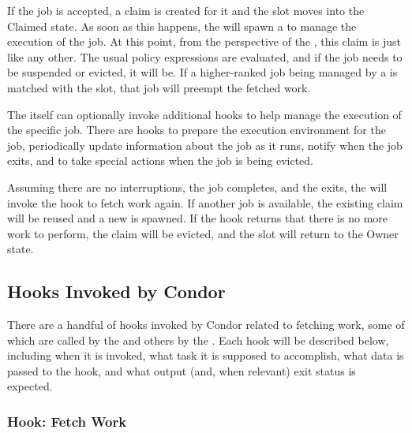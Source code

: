 If the job is accepted, a claim is created for it and the slot moves
into the Claimed state.
As soon as this happens, the  will spawn a
 to manage the execution of the job.
At this point, from the perspective of the , this claim
is just like any other.
The usual policy expressions are evaluated, and if the job needs to be
suspended or evicted, it will be.
If a higher-ranked job being managed by a  is matched
with the slot, that job will preempt the fetched work.

The  itself can optionally invoke additional hooks to
help manage the execution of the specific job.
There are hooks to prepare the execution environment for the job,
periodically update information about the job as it runs, notify when
the job exits, and to take special actions when the job is being evicted.

Assuming there are no interruptions, the job completes, and the
 exits, the  will invoke the hook to
fetch work again.
If another job is available, the existing claim will be reused and a
new  is spawned.
If the hook returns that there is no more work to perform, the claim
will be evicted, and the slot will return to the Owner state.


\subsection{\label{sec:job-hooks-hooks}
Hooks Invoked by Condor}

There are a handful of hooks invoked by Condor related to fetching
work, some of which are called by the  and others by
the .
Each hook will be described below, including when it is invoked, what
task it is supposed to accomplish, what data is passed to the hook,
and what output (and, when relevant) exit status is expected.


\subsubsection{\label{sec:job-hooks-fetch-work}
Hook: Fetch Work}

